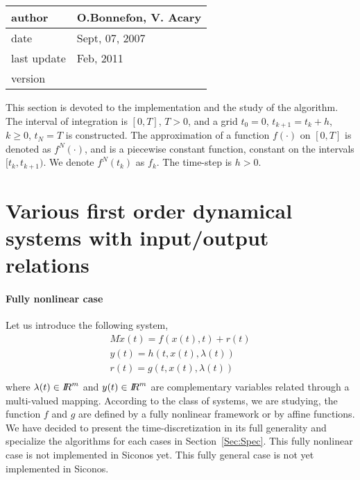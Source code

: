  \begin{table}[!ht]
  \begin{tabular}{|l|l|}
    \hline
    author  & O.Bonnefon, V. Acary\\
    \hline
    date    & Sept, 07, 2007 \\ 
    last update        &Feb, 2011 \\ 
    \hline
    version &  \\
    \hline
  \end{tabular}
\end{table}



This section is devoted to the implementation and the study  of the algorithm. The interval of integration is $[0,T]$, $T>0$, and a grid $t_{0}=0$, $t_{k+1}=t_{k}+h$, $k \geq 0$, $t_{N}=T$ is constructed. The approximation of a function $f(\cdot)$ on $[0,T]$ is denoted as $f^{N}(\cdot)$, and is a piecewise constant function, constant on the intervals $[t_{k},t_{k+1})$. We denote $f^{N}(t_{k})$ as $f_{k}$. The time-step is $h>0$. 


\section{Various first order dynamical systems with input/output relations}

\paragraph{Fully nonlinear case}
Let us introduce the following system, 
\begin{equation}
\begin{array}{l}
M \dot{x}(t) = f(x(t),t) + r(t)  \\[2mm]
y(t) = h(t,x(t),\lambda (t)) \\[2mm]
r(t) = g(t,x(t),\lambda (t) ) \\[2mm]
\end{array}
\label{first-DS}
\end{equation}
where $\lambda(t) \in \mbox{\rm $I\!\!R$}^m$  and $y(t) \in \mbox{\rm $I\!\!R$}^m$ are  complementary variables related through a multi-valued mapping.   According to the class of systems, we are studying, the function $f$ and $g$ are defined by a fully nonlinear framework or by affine functions. We have decided to present the time-discretization in its full generality and specialize the algorithms for each cases in Section~\ref{Sec:Spec}. This fully nonlinear case is not  implemented in Siconos yet. This fully general case is not yet implemented in Siconos.


